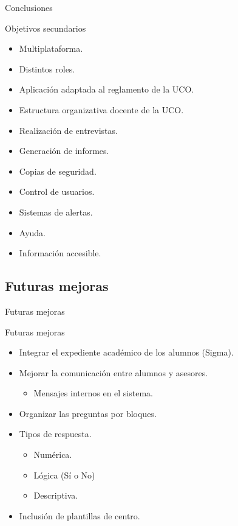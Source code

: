 \documentclass[10pt, hyperref={pdfpagelabels=false}]{beamer}
\begin{document}
      \begin{frame}{Conclusiones}
        \begin{block}{Objetivos secundarios}
          \begin{itemize}
            \item Multiplataforma.
            \item Distintos roles.
            \item Aplicación adaptada al reglamento de la UCO.
            \item Estructura organizativa docente de la UCO.
            \item Realización de entrevistas.
            \item Generación de informes.
            \item Copias de seguridad.
            \item Control de usuarios.
            \item Sistemas de alertas.
            \item Ayuda.
            \item Información accesible.
          \end{itemize}
        \end{block}
      \end{frame}

    \subsection{Futuras mejoras}
      \begin{frame}{Futuras mejoras}
        \begin{block}{Futuras mejoras}
          \begin{itemize}
            \item Integrar el expediente académico de los alumnos (Sigma).
            \item Mejorar la comunicación entre alumnos y asesores.
            \begin{itemize}
              \item Mensajes internos en el sistema.
            \end{itemize}
            \item Organizar las preguntas por bloques.
            \item Tipos de respuesta.
            \begin{itemize}
              \item Numérica.
              \item Lógica (Sí o No)
              \item Descriptiva.
            \end{itemize}
            \item Inclusión de plantillas de centro.
          \end{itemize}
        \end{block}
      \end{frame}
\end{document}
